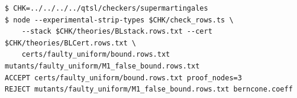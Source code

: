 \begin{Verbatim}[fontsize=\small,frame=leftline,rulecolor=\color{accentmid},framesep=3mm,xleftmargin=3mm]
$ CHK=../../../../qtsl/checkers/supermartingales
$ node --experimental-strip-types $CHK/check_rows.ts \
    --stack $CHK/theories/BLstack.rows.txt --cert $CHK/theories/BLCert.rows.txt \
    certs/faulty_uniform/bound.rows.txt mutants/faulty_uniform/M1_false_bound.rows.txt
ACCEPT certs/faulty_uniform/bound.rows.txt proof_nodes=3
REJECT mutants/faulty_uniform/M1_false_bound.rows.txt berncone.coeff
\end{Verbatim}
